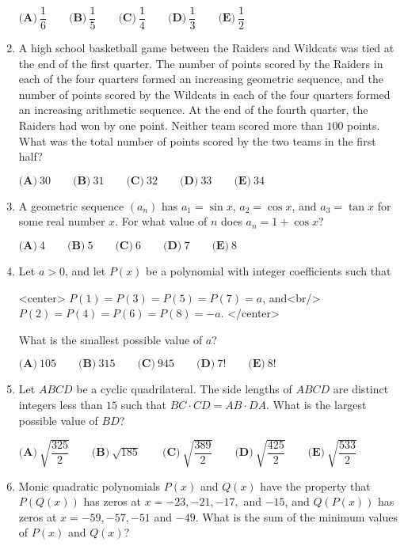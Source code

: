 \documentclass{article}
\begin{document}
\begin{enumerate}[label=\arabic*., itemsep=0.5em]
\(\textbf{(A)}\ \dfrac{1}{6} \qquad \textbf{(B)}\ \dfrac{1}{5} \qquad \textbf{(C)}\ \dfrac{1}{4} \qquad \textbf{(D)}\ \dfrac{1}{3} \qquad \textbf{(E)}\ \dfrac{1}{2}\)\par \vspace{0.5em}\item A high school basketball game between the Raiders and Wildcats was tied at the end of the first quarter. The number of points scored by the Raiders in each of the four quarters formed an increasing geometric sequence, and the number of points scored by the Wildcats in each of the four quarters formed an increasing arithmetic sequence. At the end of the fourth quarter, the Raiders had won by one point. Neither team scored more than \(100\) points. What was the total number of points scored by the two teams in the first half?

\(\textbf{(A)}\ 30 \qquad \textbf{(B)}\ 31 \qquad \textbf{(C)}\ 32 \qquad \textbf{(D)}\ 33 \qquad \textbf{(E)}\ 34\)\par \vspace{0.5em}\item A geometric sequence \((a_n)\) has \(a_1=\sin x\), \(a_2=\cos x\), and \(a_3= \tan x\) for some real number \(x\). For what value of \(n\) does \(a_n=1+\cos x\)?


\(\textbf{(A)}\ 4 \qquad \textbf{(B)}\ 5 \qquad \textbf{(C)}\ 6 \qquad \textbf{(D)}\ 7 \qquad \textbf{(E)}\ 8\)\par \vspace{0.5em}\item Let \(a > 0\), and let \(P(x)\) be a polynomial with integer coefficients such that

<center>
\(P(1) = P(3) = P(5) = P(7) = a\), and<br/>
\(P(2) = P(4) = P(6) = P(8) = -a\).
</center>

What is the smallest possible value of \(a\)?

\(\textbf{(A)}\ 105 \qquad \textbf{(B)}\ 315 \qquad \textbf{(C)}\ 945 \qquad \textbf{(D)}\ 7! \qquad \textbf{(E)}\ 8!\)\par \vspace{0.5em}\item Let \(ABCD\) be a cyclic quadrilateral. The side lengths of \(ABCD\) are distinct integers less than \(15\) such that \(BC\cdot CD=AB\cdot DA\). What is the largest possible value of \(BD\)?

\(\textbf{(A)}\ \sqrt{\dfrac{325}{2}} \qquad \textbf{(B)}\ \sqrt{185} \qquad \textbf{(C)}\ \sqrt{\dfrac{389}{2}} \qquad \textbf{(D)}\ \sqrt{\dfrac{425}{2}} \qquad \textbf{(E)}\ \sqrt{\dfrac{533}{2}}\)\par \vspace{0.5em}\item Monic quadratic polynomials \(P(x)\) and \(Q(x)\) have the property that \(P(Q(x))\) has zeros at \(x=-23, -21, -17,\) and \(-15\), and \(Q(P(x))\) has zeros at \(x=-59,-57,-51\) and \(-49\). What is the sum of the minimum values of \(P(x)\) and \(Q(x)\)? 


\end{enumerate}
\end{document}
